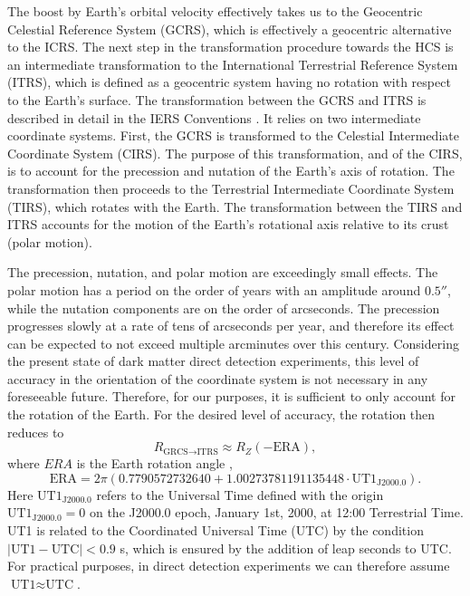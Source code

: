 The boost by Earth's orbital velocity effectively takes us to the Geocentric Celestial Reference System (GCRS), which is effectively a geocentric alternative to the ICRS. The next step in the transformation procedure towards the HCS is an intermediate transformation to the International Terrestrial Reference System (ITRS), which is defined as a geocentric system having no rotation with respect to the Earth's surface. The transformation between the GCRS and ITRS is described in detail in the IERS Conventions \parencite{LuzumPetit2010}. It relies on two intermediate coordinate systems. First, the GCRS is transformed to the Celestial Intermediate Coordinate System (CIRS). The purpose of this transformation, and of the CIRS, is to account for the precession and nutation of the Earth's axis of rotation. The transformation then proceeds to the Terrestrial Intermediate Coordinate System (TIRS), which rotates with the Earth. The transformation between the TIRS and ITRS accounts for the motion of the Earth's rotational axis relative to its crust (polar motion).

The precession, nutation, and polar motion are exceedingly small effects. The polar motion has a period on the order of years with an amplitude around $0.5''$, while the nutation components are on the order of arcseconds. The precession progresses slowly at a rate of tens of arcseconds per year, and therefore its effect can be expected to not exceed multiple arcminutes over this century. Considering the present state of dark matter direct detection experiments, this level of accuracy in the orientation of the coordinate system is not necessary in any foreseeable future. Therefore, for our purposes, it is sufficient to only account for the rotation of the Earth. For the desired level of accuracy, the rotation then reduces to
\begin{equation}
    R_{\text{GRCS}\rightarrow\text{ITRS}}\approx R_Z(-\text{ERA}),
\end{equation}
where $ERA$ is the Earth rotation angle \parencite{LuzumPetit2010},
\begin{equation}
    \text{ERA}=2\pi(0.7790572732640+1.00273781191135448\cdot\text{UT1}_\text{J2000.0}).
\end{equation}
Here $\text{UT1}_\text{J2000.0}$ refers to the Universal Time defined with the origin $\text{UT1}_\text{J2000.0}=0$ on the J2000.0 epoch, January 1st, 2000, at 12:00 Terrestrial Time. UT1 is related to the Coordinated Universal Time (UTC) by the condition $|\text{UT1}-\text{UTC}|<0.9$ s, which is ensured by the addition of leap seconds to UTC. For practical purposes, in direct detection experiments we can therefore assume $\text{UT1}\approx\text{UTC}$.

